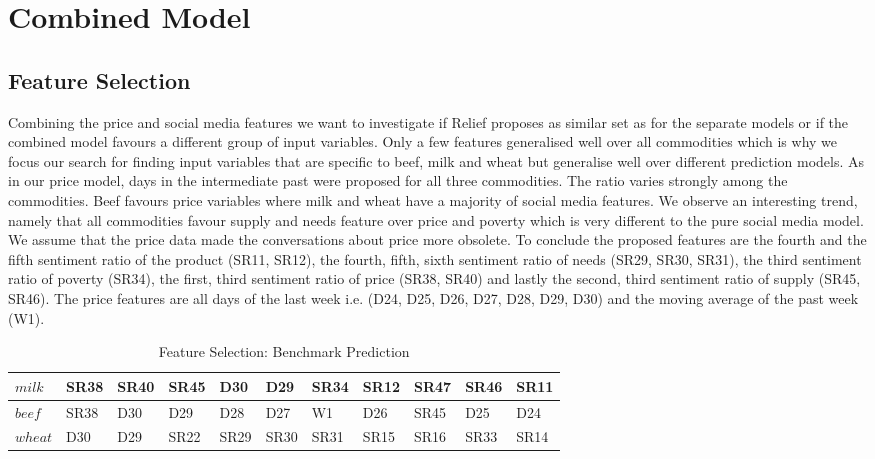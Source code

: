 \section{Combined Model}


\subsection{Feature Selection}

Combining the price and social media features we want to investigate if Relief proposes as similar set as for the separate models or if the combined model favours a different group of input variables. Only a few features generalised well over all commodities which is why we focus our search for finding input variables that are specific to beef, milk and wheat but generalise well over different prediction models. As in our price model, days in the intermediate past were proposed for all three commodities. The ratio varies strongly among the commodities. Beef favours price variables where milk and wheat have a majority of social media features. We observe an interesting trend, namely that all commodities favour supply and needs feature over price and poverty which is very different to the pure social media model. We assume that the price data made the conversations about price more obsolete. To conclude the proposed features are the fourth and the fifth sentiment ratio of the product (SR11, SR12), the fourth, fifth, sixth sentiment ratio of needs (SR29, SR30, SR31), the third sentiment ratio of poverty (SR34), the first, third sentiment ratio of price (SR38, SR40) and lastly the second, third sentiment ratio of supply (SR45, SR46). The price features are all days of the last week i.e. (D24, D25, D26, D27, D28, D29, D30) and the moving average of the past week (W1). 




\begin{table}[H]
\centering
\begin{tabular}{ |p{2cm}|p{1cm}|p{1cm}|p{1cm}|p{1cm}|p{1cm}|p{1cm}|p{1cm}|p{1cm}|p{1cm}| p{1cm}|  }
\hline
$milk$ & SR38 & SR40 & SR45 & D30 & D29 &  SR34 & SR12 & SR47 & SR46 & SR11 \\
\hline
$beef$ & SR38 & D30 & D29 & D28 & D27 &  W1 & D26 & SR45 & D25 & D24 \\
\hline
$wheat$ & D30 & D29 & SR22 & SR29 & SR30 & SR31 & SR15 & SR16 & SR33 & SR14 \\
\hline
\end{tabular}
\caption{Feature Selection: Benchmark Prediction}
\label{tab:feat_mod3}
\end{table}




